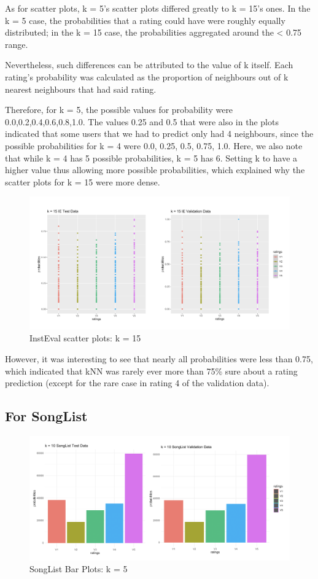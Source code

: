 \documentclass{article}
\begin{document}
As for scatter plots, k = 5's scatter plots differed greatly to k = 15's ones. In the k = 5 case, the probabilities that a rating could have were roughly equally distributed; in the k = 15 case, the probabilities aggregated around the < 0.75 range. 

Nevertheless, such differences can be attributed to the value of k itself. Each rating's probability was calculated as the proportion of neighbours out of k nearest neighbours that had said rating. 

Therefore, for k = 5, the possible values for probability were {0.0,0.2,0.4,0.6,0.8,1.0}. The values 0.25 and 0.5 that were also in the plots indicated that some users that we had to predict only had 4 neighbours, since the possible probabilities for k = 4 were {0.0, 0.25, 0.5, 0.75, 1.0}. Here, we also note that while k = 4 has 5 possible probabilities, k = 5 has 6. Setting k to have a higher value thus allowing more possible probabilities, which explained why the scatter plots for k = 15 were more dense. 


\begin{figure}[ht]
\centering
\includegraphics[scale=0.35]{k = 15 IE Scatter Plot.png}
\caption{InstEval scatter plots: k = 15}
\end{figure}

However, it was interesting to see that nearly all probabilities were less than 0.75, which indicated that kNN was rarely ever more than 75\% sure about a rating prediction (except for the rare case in rating 4 of the validation data).

\subsection{For SongList}

\begin{figure}[ht]
\centering
\includegraphics[scale=0.25]{k = 10 SL Bar Plot.png}
\caption{SongList Bar Plots: k = 5}
\end{figure}
\end{document}

